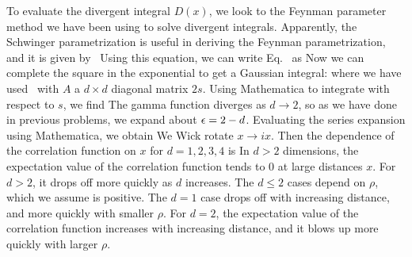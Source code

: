 {	To evaluate the divergent integral $D(x)$, we look to the Feynman parameter method we have been using to solve divergent integrals.  Apparently, the Schwinger parametrization is useful in deriving the Feynman parametrization, and it is given by~\cite{Feynman}
	Using this equation, we can write Eq.~ as
	Now we can complete the square in the exponential to get a Gaussian integral:
	where we have used~\cite{QFT}
	with $A$ a $d \times d$ diagonal matrix $2s$.  Using Mathematica to integrate with respect to $s$, we find
	The gamma function diverges as $d \to 2$, so as we have done in previous problems, we expand about $\epsilon = 2 - d$.  Evaluating the series expansion using Mathematica, we obtain
	We Wick rotate $x \to i x$.  Then the dependence of the correlation function on $x$ for $d = 1, 2, 3, 4$ is
	In $d > 2$ dimensions, the expectation value of the correlation function tends to 0 at large distances $x$.  For $d > 2$, it drops off more quickly as $d$ increases.  The $d \leq 2$ cases depend on $\rho$, which we assume is positive.  The $d = 1$ case drops off with increasing distance, and more quickly with smaller $\rho$.  For $d = 2$, the expectation value of the correlation function increases with increasing distance, and it blows up more quickly with larger $\rho$.
	
}
